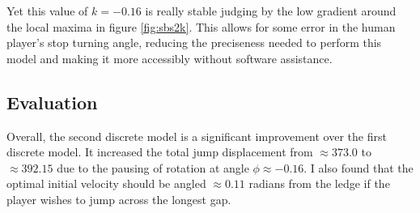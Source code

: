 Yet this value of $k=-0.16$ is really stable judging by the low gradient around the local maxima in figure \ref{fig:sbs2k}. This allows for some error in the human player's stop turning angle, reducing the preciseness needed to perform this model and making it more accessibly without software assistance.


%
%
%
%
%

\subsection{Evaluation}
Overall, the second discrete model is a significant improvement over the first discrete model. It increased the total jump displacement from $\approx 373.0$ to $\approx 392.15$ due to the pausing of rotation at angle $\phi \approx -0.16$. I also found that the optimal initial velocity should be angled $\approx 0.11$ radians from the ledge if the player wishes to jump across the longest gap.

